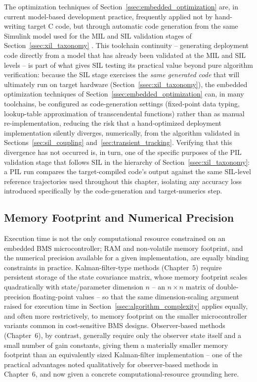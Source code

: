 The optimization techniques of Section~\ref{ssec:embedded_optimization} are, in current model-based development practice, frequently applied not by hand-writing target C code, but through automatic code generation from the same Simulink model used for the MIL and SIL validation stages of Section~\ref{ssec:xil_taxonomy} \cite{mathworks_bms_solutions}. This toolchain continuity -- generating deployment code directly from a model that has already been validated at the MIL and SIL levels -- is part of what gives SIL testing its practical value beyond pure algorithm verification: because the SIL stage exercises the \emph{same generated code} that will ultimately run on target hardware (Section~\ref{ssec:xil_taxonomy}), the embedded optimization techniques of Section~\ref{ssec:embedded_optimization} can, in many toolchains, be configured as code-generation settings (fixed-point data typing, lookup-table approximation of transcendental functions) rather than as manual re-implementation, reducing the risk that a hand-optimized deployment implementation silently diverges, numerically, from the algorithm validated in Sections~\ref{sec:sil_coupling} and~\ref{sec:transient_tracking}. Verifying that this divergence has not occurred is, in turn, one of the specific purposes of the PIL validation stage that follows SIL in the hierarchy of Section~\ref{ssec:xil_taxonomy}: a PIL run compares the target-compiled code's output against the same SIL-level reference trajectories used throughout this chapter, isolating any accuracy loss introduced specifically by the code-generation and target-numerics step.

\subsection{Memory Footprint and Numerical Precision}
\label{ssec:memory_footprint}

Execution time is not the only computational resource constrained on an embedded BMS microcontroller; RAM and non-volatile memory footprint, and the numerical precision available for a given implementation, are equally binding constraints in practice. Kalman-filter-type methods (Chapter~5) require persistent storage of the state covariance matrix, whose memory footprint scales quadratically with state/parameter dimension $n$ -- an $n \times n$ matrix of double-precision floating-point values -- so that the same dimension-scaling argument raised for execution time in Section~\ref{ssec:algorithm_complexity} applies equally, and often more restrictively, to memory footprint on the smaller microcontroller variants common in cost-sensitive BMS designs. Observer-based methods (Chapter~6), by contrast, generally require only the observer state itself and a small number of gain constants, giving them a materially smaller memory footprint than an equivalently sized Kalman-filter implementation -- one of the practical advantages noted qualitatively for observer-based methods in Chapter~6, and now given a concrete computational-resource grounding here.


